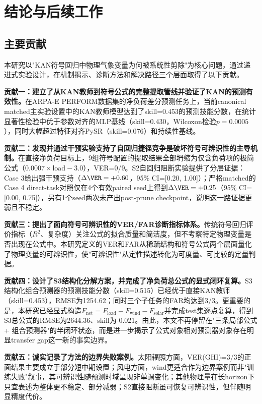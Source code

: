 \chapter{结论与后续工作}

\section{主要贡献}

本研究以"KAN符号回归中物理气象变量为何被系统性剪除"为核心问题，通过递进式实验设计，在机制揭示、诊断方法和解决路径三个层面取得了以下贡献。

\textbf{贡献一：建立了从KAN教师到符号公式的完整提取管线并验证了KAN的预测有效性。}在ARPA-E PERFORM数据集的净负荷差分预测任务上，当前canonical matched主实验设置中的KAN教师模型达到了skill=0.453的预测技能分数，在统计显著性检验中优于参数对齐的MLP基线（skill=0.430，Wilcoxon检验$p=0.0005$），同时大幅超过特征对齐PySR（skill=0.076）和持续性基线。

\textbf{贡献二：发现并通过干预实验支持了自回归捷径竞争是破坏符号可辨识性的主导机制。}在直接净负荷目标上，9组符号配置的提取结果全部坍缩为仅含负荷项的极简公式（$0.0007 \times \text{load} - 3.0$），VER=0/9。S2自回归阻断实验提供了分层证据：Case 3给出强干预支持（$\Delta\VER=+0.60$，95\% CI=[0.20, 1.00]）；严格matched的Case 4 direct-task对照仅在4个有效paired seed上得到$\Delta\VER=+0.25$（95\% CI=[0.00, 0.75]），另有1个seed两次未产出post-prune checkpoint，说明这一路证据更弱且不稳定。

\textbf{贡献三：提出了面向符号可辨识性的VER/FAR诊断指标体系。}传统符号回归评价指标（$R^2$、复杂度）关注公式的拟合质量和简洁度，但不考察特定物理变量是否出现在公式中。本研究定义的VER和FAR从稀疏结构和符号公式两个层面量化了物理变量的可辨识性，使"可辨识性"从定性描述转化为可度量、可比较的定量判据。

\textbf{贡献四：设计了S3结构化分解方案，并完成了净负荷总公式的显式闭环复算。}S3结构化组合预测器的预测技能分数（skill=0.515）已经优于直接KAN教师（skill=0.453），RMSE为1254.62；同时三个子任务的FAR均达到3/3。更重要的是，本研究已经显式构造$F_{\text{net}} = F_{\text{load}} - F_{\text{wind}} - F_{\text{solar}}$并完成test集逐点复算，得到S3总公式的RMSE为2644.36、skill为-0.021。由此，本文不再停留在"三条局部公式 + 组合预测器"的半闭环状态，而是进一步揭示了公式对象相对预测器对象存在明显transfer gap这一新的事实边界。

\textbf{贡献五：诚实记录了方法的边界失败案例。}太阳辐照方面，VER(GHI)=3/3的正面结果主要成立于部分短中期设置；风电方面，wind更适合作为边界案例而非"训练失败"叙事，其可辨识性随预测时域呈现非单调变化；其他物理量在长horizon下只宜表述为整体更不稳定、部分减弱；S2直接阻断虽可恢复可辨识性，但伴随明显精度代价。

